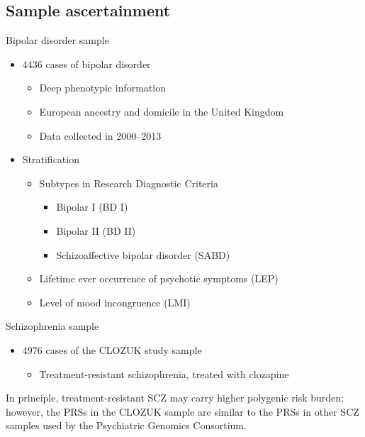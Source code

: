 \documentclass{beamer}
\begin{document}
\subsection{Sample ascertainment}
\begin{frame}{Bipolar disorder sample}
    \begin{itemize}
        \item 4436 cases of bipolar disorder
            \begin{itemize}
                \item Deep phenotypic information
                \item European ancestry and domicile in the United Kingdom
                \item Data collected in 2000--2013
            \end{itemize}
        \item Stratification
            \begin{itemize}
                \item Subtypes in Research Diagnostic Criteria
                    \begin{itemize}
                        \item Bipolar I (BD I)
                        \item Bipolar II (BD II)
                        \item Schizoaffective bipolar disorder (SABD)
                    \end{itemize}
                \item Lifetime ever occurrence of psychotic symptoms (LEP)
                \item Level of mood incongruence (LMI)
            \end{itemize}
    \end{itemize}
\end{frame}

\begin{frame}{Schizophrenia sample}
    \begin{itemize}
        \item 4976 cases of the CLOZUK study sample
            \begin{itemize}
                \item Treatment-resistant schizophrenia, treated with clozapine
            \end{itemize}
    \end{itemize}

    In principle, treatment-resistant SCZ may carry higher polygenic risk
    burden; however, the PRSs in the CLOZUK sample are similar to the PRSs in
    other SCZ samples used by the Psychiatric Genomics Consortium.
\end{frame}
\end{document}
